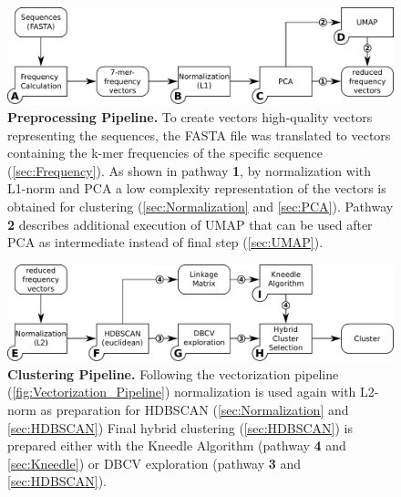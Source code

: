 \begin{figure}[!hbt]
    \centering
    \includegraphics[width=\textwidth]{Graphics/Vectorization.pdf}
    \caption[Preprocessing Pipeline]{\textbf{Preprocessing Pipeline.} To create vectors high-quality vectors representing the sequences, the FASTA file was translated to vectors containing the k-mer frequencies of the specific sequence (\autoref{sec:Frequency}). As shown in pathway \textsf{\textbf{1}}, by normalization with L1-norm and \gls{PCA} a low complexity representation of the vectors is obtained for clustering (\autoref{sec:Normalization} and \autoref{sec:PCA}). Pathway \textsf{\textbf{2}} describes additional execution of \gls{UMAP} that can be used after \gls{PCA} as intermediate instead of final step (\autoref{sec:UMAP}).}
    \label{fig:Vectorization_Pipeline}
\end{figure}

\begin{figure}[!hbt]
    \centering
    \includegraphics[width=\textwidth]{Graphics/Clustering.pdf}
    \caption[Clustering Pipeline]{\textbf{Clustering Pipeline.} Following the vectorization pipeline (\autoref{fig:Vectorization_Pipeline}) normalization is used again with L2-norm as preparation for \gls{HDBSCAN} (\autoref{sec:Normalization} and \autoref{sec:HDBSCAN}) Final hybrid clustering (\autoref{sec:HDBSCAN}) is prepared either with the Kneedle Algorithm (pathway \textsf{\textbf{4}} and \autoref{sec:Kneedle}) or DBCV exploration (pathway \textsf{\textbf{3}} and \autoref{sec:HDBSCAN}).}
    \label{fig:Clustering_Pipeline}
\end{figure}

